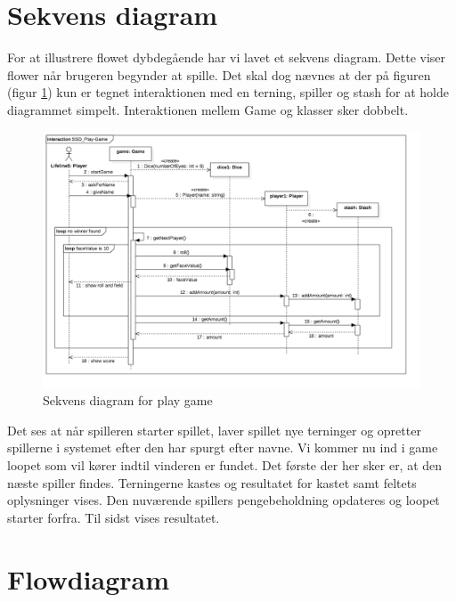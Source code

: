\section{Sekvens diagram}

For at illustrere flowet dybdegående har vi lavet et sekvens diagram.
Dette viser flower når brugeren begynder at spille.
Det skal dog nævnes at der på figuren (figur \ref{fig:sequence_diagram}) kun er tegnet interaktionen med en terning, spiller og stash for at holde diagrammet simpelt.
Interaktionen mellem Game og klasser sker dobbelt.

\begin{figure}[H]
    \begin{center}
        \includegraphics[width=15cm]{graphics/SSD_Play-Game.png}
        \caption{Sekvens diagram for play game}
        \label{fig:sequence_diagram}
    \end{center}
\end{figure}

\noindent Det ses at når spilleren starter spillet, laver spillet nye terninger og opretter spillerne i systemet efter den har spurgt efter navne.
Vi kommer nu ind i game loopet som vil kører indtil vinderen er fundet.
Det første der her sker er, at den næste spiller findes.
Terningerne kastes og resultatet for kastet samt feltets oplysninger vises.
Den nuværende spillers pengebeholdning opdateres og loopet starter forfra.
Til sidst vises resultatet.

\newpage

\section{Flowdiagram}

